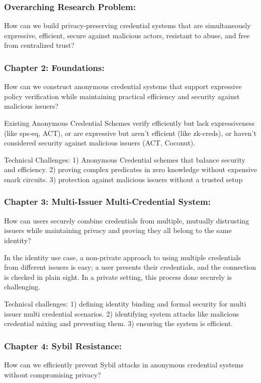 \subsubsection*{Overarching Research Problem: }
How can we build privacy-preserving credential systems that are simultaneously expressive, efficient, secure against malicious actors, resistant to abuse, and free from centralized trust?


\subsubsection*{Chapter 2: Foundations: } 
How can we construct anonymous credential systems that support expressive policy verification while maintaining practical efficiency and security against malicious issuers?

Existing Anonymous Credential Schemes verify efficiently but lack expressiveness (like sps-eq, ACT), or are expressive but aren't efficient (like zk-creds), or haven't considered security against malicious issuers (ACT, Coconut). 

Technical Challenges: 1) Anonymous Credential schemes that balance security and efficiency. 2) proving complex predicates in zero knowledge without expensive snark circuits. 3) protection against malicious issuers without a trusted setup

\subsubsection*{Chapter 3: Multi-Issuer Multi-Credential System: } 
How can users securely combine credentials from multiple, mutually distrusting issuers while maintaining privacy and proving they all belong to the same identity?

In the identity use case, a non-private approach to using multiple credentials from different issuers is easy; a user presents their credentials, and the connection is checked in plain sight. In a private setting, this process done securely is challenging. 

Technical challenges: 1) defining identity binding and formal security for multi issuer multi credential scenarios. 2) identifying system attacks like malicious credential mixing and preventing them. 3) ensuring the system is efficient.


\subsubsection*{Chapter 4: Sybil Resistance: } 
How can we efficiently prevent Sybil attacks in anonymous credential systems without compromising privacy?

